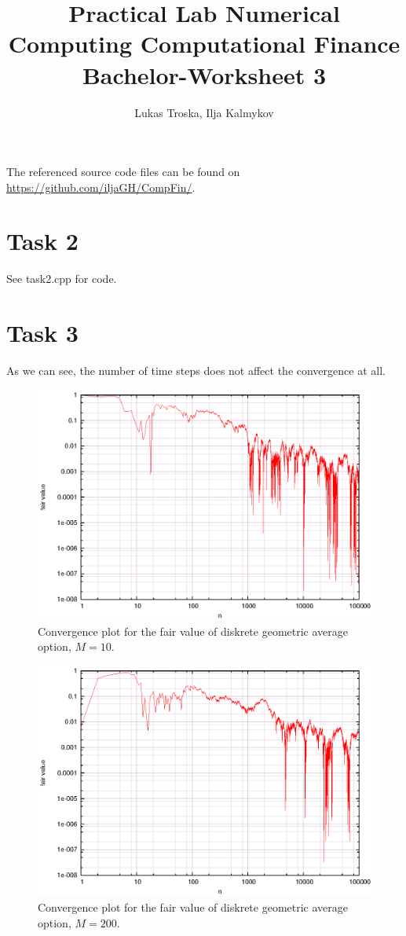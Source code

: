 \documentclass[]{article}
\title{Practical Lab Numerical Computing Computational Finance \\Bachelor-Worksheet 3}
\author{Lukas Troska, Ilja Kalmykov}
\date{}
\begin{document}
\maketitle

The referenced source code files can be found on
\url{https://github.com/iljaGH/CompFin/}.

\section*{Task 2}
See task2.cpp for code.

\section*{Task 3}
As we can see, the number of time steps does not
affect the convergence at all.
\begin{figure}[!ht]
\includegraphics[width=.9\textwidth]{task3_10.eps}
\caption{Convergence plot for the fair value of diskrete geometric average
option, $M = 10$.}
\label{fig:Task3a}
\end{figure}
\begin{figure}[!ht]
\includegraphics[width=.9\textwidth]{task3_200.eps}
\caption{Convergence plot for the fair value of diskrete geometric average
option, $M = 200$.}
\label{fig:Task3b}
\end{figure}
\clearpage
\end{document}

